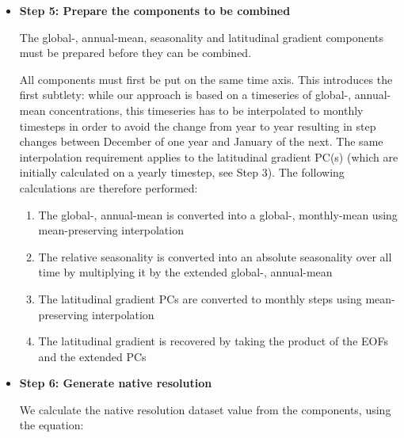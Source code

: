 \begin{itemize}
    \item {
        \textbf{Step 5: Prepare the components to be combined}

        The global-, annual-mean, seasonality and latitudinal gradient components must be prepared before they can be combined.

        All components must first be put on the same time axis.
        This introduces the first subtlety: while our approach is based on a timeseries of global-, annual-mean concentrations,
        this timeseries has to be interpolated to monthly timesteps
        in order to avoid the change from year to year resulting in step changes between December of one year and January of the next.
        The same interpolation requirement applies to the latitudinal gradient PC(s)
        (which are initially calculated on a yearly timestep, see Step 3).
        The following calculations are therefore performed:

        \begin{enumerate}
            \item The global-, annual-mean is converted into a global-, monthly-mean using mean-preserving interpolation
            \item The relative seasonality is converted into an absolute seasonality over all time by multiplying it by the extended global-, annual-mean
            \item The latitudinal gradient PCs are converted to monthly steps using mean-preserving interpolation
            \item The latitudinal gradient is recovered by taking the product of the EOFs and the extended PCs
        \end{enumerate}
    }

    \item {
        \textbf{Step 6: Generate native resolution}

        We calculate the native resolution dataset value from the components, using the equation:

}
\end{itemize}
